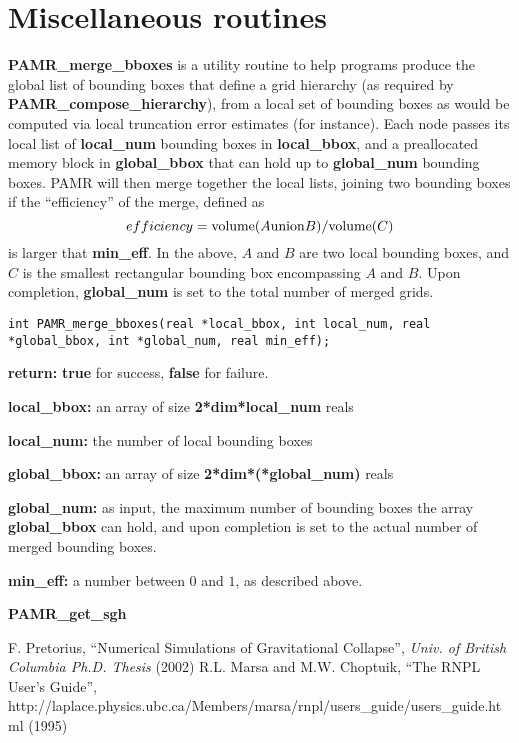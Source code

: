 \documentclass[aps,amssymb,unsortedaddress,nofootinbib]{revtex4}
\def\lsep{\itemsep 0.05in}
\begin{document}

\section{Miscellaneous routines}


{\bf PAMR\_merge\_bboxes} is a utility routine to help programs produce the global list
of bounding boxes that define a grid hierarchy (as required by {\bf PAMR\_compose\_hierarchy}),
from a local set of bounding boxes as would be computed via local truncation error estimates
(for instance). Each node passes its local list of {\bf local\_num} bounding boxes in
{\bf local\_bbox}, and a preallocated memory block in {\bf global\_bbox} that can hold up
to {\bf global\_num} bounding boxes. PAMR will then merge together the local lists, joining
two bounding boxes if the ``efficiency'' of the merge, defined as
\begin{equation}
efficiency = {\rm volume}(A {\rm union} B)/{\rm volume}(C)
\end{equation}
is larger that {\bf min\_eff}. In the above, $A$ and $B$ are two local bounding boxes, and $C$ 
is the smallest rectangular bounding box encompassing $A$ and $B$.
Upon completion, {\bf global\_num} is set to the total number of merged grids.

\begin{verbatim}
int PAMR_merge_bboxes(real *local_bbox, int local_num, real *global_bbox, int *global_num, real min_eff);
\end{verbatim}
\begin{list}{}{\lsep}
\item {\bf return:} {\bf true} for success, {\bf false} for failure.
\item {\bf *local\_bbox:} an array of size {\bf 2*dim*local\_num} reals
\item {\bf local\_num:} the number of local bounding boxes
\item {\bf *global\_bbox:} an array of size {\bf 2*dim*(*global\_num)} reals
\item {\bf *global\_num:} as input, the maximum number of bounding boxes the array {\bf global\_bbox}
                          can hold, and upon completion is set to the actual number of 
                          merged bounding boxes.
\item {\bf min\_eff:} a number between $0$ and $1$, as described above.
\end{list}

{\bf PAMR\_get\_sgh}

\begin{thebibliography}{1}
 F. Pretorius,
 ``Numerical Simulations of Gravitational Collapse'',
 {\em Univ. of British Columbia Ph.D. Thesis} (2002)
 R.L. Marsa and M.W. Choptuik,
 ``The RNPL User's Guide'',
 {http://laplace.physics.ubc.ca/Members/marsa/rnpl/users\_guide/users\_guide.html}
 (1995)
\end{thebibliography}
\end{document}
